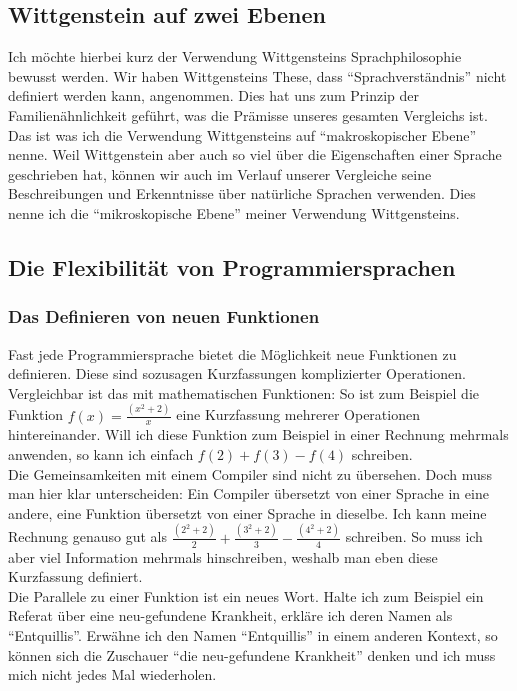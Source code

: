 \documentclass[10pt,a4paper]{article}
\begin{document}
\subsection{Wittgenstein auf zwei Ebenen}
Ich möchte hierbei kurz der Verwendung Wittgensteins Sprachphilosophie bewusst werden. Wir haben Wittgensteins These, dass \enquote{Sprachverständnis} nicht definiert werden kann, angenommen. Dies hat uns zum Prinzip der Familienähnlichkeit geführt, was die Prämisse unseres gesamten Vergleichs ist. Das ist was ich die Verwendung Wittgensteins auf \enquote{makroskopischer Ebene} nenne.
Weil Wittgenstein aber auch so viel über die Eigenschaften einer Sprache geschrieben hat, können wir auch im Verlauf unserer Vergleiche seine Beschreibungen und Erkenntnisse über natürliche Sprachen verwenden. Dies nenne ich die \enquote{mikroskopische Ebene} meiner Verwendung Wittgensteins.


\subsection{Die Flexibilität von Programmiersprachen}
\subsubsection{Das Definieren von neuen Funktionen}
Fast jede Programmiersprache bietet die Möglichkeit neue Funktionen zu definieren. Diese sind sozusagen Kurzfassungen komplizierter Operationen. Vergleichbar ist das mit mathematischen Funktionen: So ist zum Beispiel die Funktion $f(x) = \frac{(x^2 + 2)}{x}$ eine Kurzfassung mehrerer Operationen hintereinander. Will ich diese Funktion zum Beispiel in einer Rechnung mehrmals anwenden, so kann ich einfach $f(2) + f(3) - f(4)$ schreiben. \\
Die Gemeinsamkeiten mit einem Compiler sind nicht zu übersehen. Doch muss man hier klar unterscheiden: Ein Compiler übersetzt von einer Sprache in eine andere, eine Funktion übersetzt von einer Sprache in dieselbe. Ich kann meine Rechnung genauso gut als $\frac{(2^2 + 2)}{2} + \frac{(3^2 + 2)}{3} - \frac{(4^2 + 2)}{4}$ schreiben. So muss ich aber viel Information mehrmals hinschreiben, weshalb man eben diese Kurzfassung definiert. \\
Die Parallele zu einer Funktion ist ein neues Wort. Halte ich zum Beispiel ein Referat über eine neu-gefundene Krankheit, erkläre ich deren Namen als \enquote{Entquillis}. Erwähne ich den Namen \enquote{Entquillis} in einem anderen Kontext, so können sich die Zuschauer \enquote{die neu-gefundene Krankheit} denken und ich muss mich nicht jedes Mal wiederholen. \\
\end{document}
